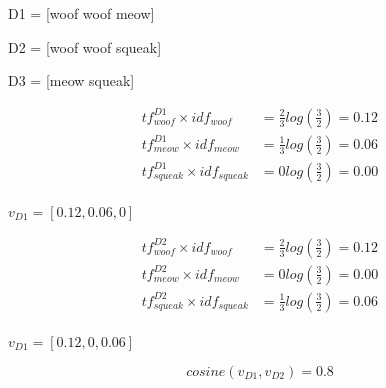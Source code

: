 D1 = [woof woof meow] 

D2 = [woof woof squeak]

D3 = [meow squeak]


\begin{equation*}
\begin{aligned}
tf^{D1}_{woof} \times idf_{woof}&= \frac{2}{3}log(\frac{3}{2}) = 0.12\\
tf^{D1}_{meow} \times idf_{meow}&= \frac{1}{3}log(\frac{3}{2})= 0.06\\
tf^{D1}_{squeak} \times idf_{squeak}&= 0 log(\frac{3}{2})= 0.00\\
\end{aligned}
\end{equation*}

$v_{D1}=[0.12, 0.06, 0]$

\begin{equation*}
\begin{aligned}
tf^{D2}_{woof} \times idf_{woof}&= \frac{2}{3}log(\frac{3}{2}) = 0.12\\
tf^{D2}_{meow} \times idf_{meow}&= 0log(\frac{3}{2})= 0.00\\
tf^{D2}_{squeak} \times idf_{squeak}&= \frac{1}{3}log(\frac{3}{2})= 0.06\\
\end{aligned}
\end{equation*}

$v_{D1}=[0.12, 0, 0.06]$

$$cosine(v_{D1}, v_{D2} )= 0.8$$
